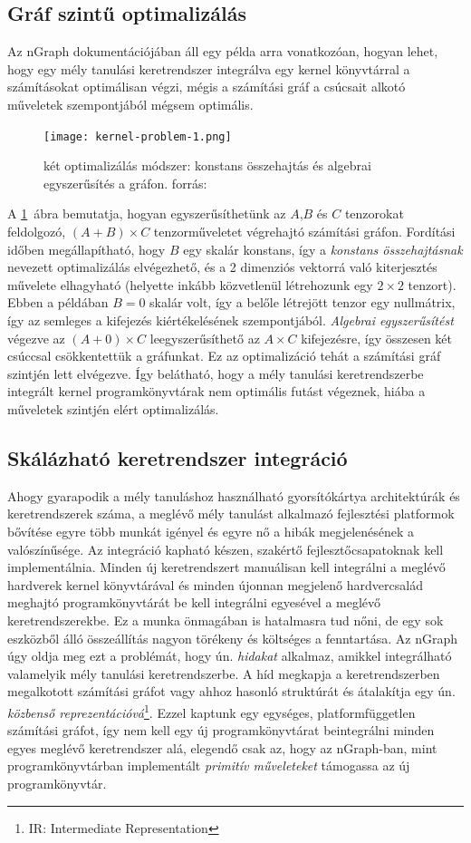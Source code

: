 \subsection{Gráf szintű optimalizálás}
Az nGraph dokumentációjában áll egy példa arra vonatkozóan, hogyan lehet, hogy egy mély tanulási keretrendszer integrálva egy {kernel könyvtárral} a számításokat optimálisan végzi, mégis a számítási gráf a csúcsait alkotó műveletek szempontjából mégsem optimális.
\begin{figure}[h]
	\centering
	\texttt{[image: kernel-problem-1.png]}
	\caption{két optimalizálás módszer: konstans összehajtás és algebrai egyszerűsítés a gráfon. \footnotesize forrás: \cite{web:ngraph_intro}}
	\label{fig:grafoptimalizalas}
\end{figure}
A \ref{fig:grafoptimalizalas}~ábra bemutatja, hogyan egyszerűsíthetünk az $A$,$B$ és $C$ tenzorokat feldolgozó, $ (A+B)\times C $ tenzorműveletet végrehajtó számítási gráfon.
Fordítási időben megállapítható, hogy $B$ egy skalár konstans, így a \emph{konstans összehajtásnak}\cite{wiki:constfold} nevezett optimalizálás elvégezhető, és a 2 dimenziós vektorrá való kiterjesztés művelete elhagyható (helyette inkább közvetlenül létrehozunk egy $2\times2$ tenzort).
Ebben a példában $B=0$ skalár volt, így a belőle létrejött tenzor egy nullmátrix, így az semleges a kifejezés kiértékelésének szempontjából.
\emph{Algebrai egyszerűsítést} végezve az $ (A+0)\times C $ leegyszerűsíthető az $A\times C$ kifejezésre, így összesen két csúccsal csökkentettük a gráfunkat.
Ez az optimalizáció tehát a számítási gráf szintjén lett elvégezve.
Így belátható, hogy a mély tanulási keretrendszerbe integrált kernel programkönyvtárak nem optimális futást végeznek, hiába a műveletek szintjén elért optimalizálás.

\subsection{Skálázható keretrendszer integráció}
Ahogy gyarapodik a mély tanuláshoz használható gyorsítókártya architektúrák és keretrendszerek száma, a meglévő mély tanulást alkalmazó fejlesztési platformok bővítése egyre több munkát igényel és egyre nő a hibák megjelenésének a valószínűsége. Az integráció kapható készen, szakértő fejlesztőcsapatoknak kell implementálnia.
Minden új keretrendszert manuálisan kell integrálni a meglévő hardverek kernel könyvtárával és minden újonnan megjelenő hardvercsalád meghajtó programkönyvtárát be kell integrálni egyesével a meglévő keretrendszerekbe.
Ez a munka önmagában is hatalmasra tud nőni, de egy sok eszközből álló összeállítás nagyon törékeny és költséges a fenntartása.
Az nGraph úgy oldja meg ezt a problémát, hogy ún. \emph{hidakat} alkalmaz, amikkel integrálható valamelyik mély tanulási keretrendszerbe.
A híd megkapja a keretrendszerben megalkotott számítási gráfot vagy ahhoz hasonló struktúrát és átalakítja egy ún. \emph{közbenső reprezentációvá}\footnote{IR: Intermediate Representation}. Ezzel kaptunk egy egységes, platformfüggetlen számítási gráfot, így nem kell egy új programkönyvtárat beintegrálni minden egyes meglévő keretrendszer alá, elegendő csak az, hogy az nGraph-ban, mint programkönyvtárban implementált \emph{primitív műveleteket} támogassa az új programkönyvtár.


